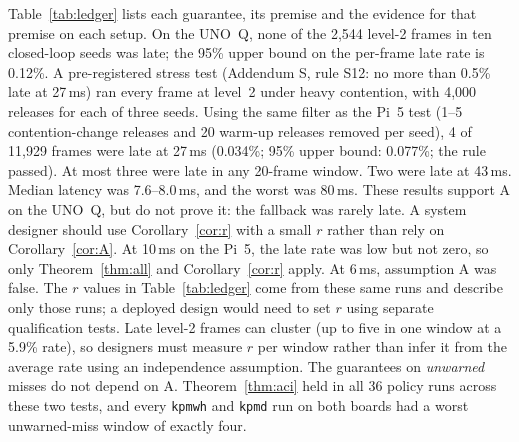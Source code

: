 \documentclass[acmsmall,screen]{acmart}
\newcommand{\pol}[1]{\texttt{#1}}
\begin{document}
Table~\ref{tab:ledger} lists each guarantee, its premise and the evidence for that premise on each setup. On the UNO~Q, none of the 2{,}544 level-2 frames in ten closed-loop seeds was late; the 95\% upper bound on the per-frame late rate is 0.12\%. A pre-registered stress test (Addendum S, rule S12: no more than 0.5\% late at 27\,ms) ran every frame at level~2 under heavy contention, with 4{,}000 releases for each of three seeds. Using the same filter as the Pi~5 test (1--5 contention-change releases and 20 warm-up releases removed per seed), 4 of 11{,}929 frames were late at 27\,ms (0.034\%; 95\% upper bound: 0.077\%; the rule passed). At most three were late in any 20-frame window. Two were late at 43\,ms. Median latency was 7.6--8.0\,ms, and the worst was 80\,ms. These results support A on the UNO~Q, but do not prove it: the fallback was rarely late. A system designer should use Corollary~\ref{cor:r} with a small $r$ rather than rely on Corollary~\ref{cor:A}. At 10\,ms on the Pi~5, the late rate was low but not zero, so only Theorem~\ref{thm:all} and Corollary~\ref{cor:r} apply. At 6\,ms, assumption A was false. The $r$ values in Table~\ref{tab:ledger} come from these same runs and describe only those runs; a deployed design would need to set $r$ using separate qualification tests. Late level-2 frames can cluster (up to five in one window at a 5.9\% rate), so designers must measure $r$ per window rather than infer it from the average rate using an independence assumption. The guarantees on \emph{unwarned} misses do not depend on A. Theorem~\ref{thm:aci} held in all 36 policy runs across these two tests, and every \pol{kpmwh} and \pol{kpmd} run on both boards had a worst unwarned-miss window of exactly four.
\end{document}
